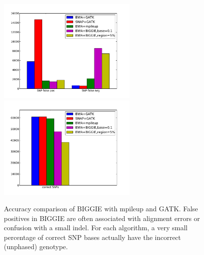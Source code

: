 \documentclass[12pt]{article}
\begin{document}
\begin{figure}[h!]
	\includegraphics[width=2.7in]{figs/variant_call_results_all.pdf} \hspace{5mm}
	\includegraphics[width=2.7in]{figs/correct_results_all.pdf}
	\caption{Accuracy comparison of BIGGIE with mpileup and GATK. False positives in BIGGIE are often associated with alignment errors or confusion with a small indel. For each algorithm, a very small percentage of correct SNP bases actually have the incorrect (unphased) genotype.} %
	\end{figure}


\vspace{-6pt}
\end{document}
